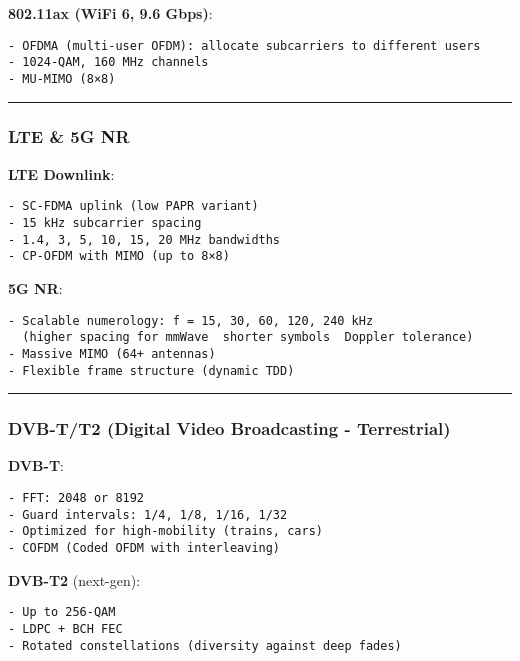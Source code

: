 \textbf{802.11ax (WiFi 6, 9.6 Gbps)}:

\begin{verbatim}
- OFDMA (multi-user OFDM): allocate subcarriers to different users
- 1024-QAM, 160 MHz channels
- MU-MIMO (8×8)
\end{verbatim}

\begin{center}\rule{0.5\linewidth}{0.5pt}\end{center}

\subsubsection{LTE \& 5G NR}\label{lte-5g-nr}

\textbf{LTE Downlink}:

\begin{verbatim}
- SC-FDMA uplink (low PAPR variant)
- 15 kHz subcarrier spacing
- 1.4, 3, 5, 10, 15, 20 MHz bandwidths
- CP-OFDM with MIMO (up to 8×8)
\end{verbatim}

\textbf{5G NR}:

\begin{verbatim}
- Scalable numerology: f = 15, 30, 60, 120, 240 kHz
  (higher spacing for mmWave  shorter symbols  Doppler tolerance)
- Massive MIMO (64+ antennas)
- Flexible frame structure (dynamic TDD)
\end{verbatim}

\begin{center}\rule{0.5\linewidth}{0.5pt}\end{center}

\subsubsection{DVB-T/T2 (Digital Video Broadcasting -
Terrestrial)}\label{dvb-tt2-digital-video-broadcasting---terrestrial}

\textbf{DVB-T}:

\begin{verbatim}
- FFT: 2048 or 8192
- Guard intervals: 1/4, 1/8, 1/16, 1/32
- Optimized for high-mobility (trains, cars)
- COFDM (Coded OFDM with interleaving)
\end{verbatim}

\textbf{DVB-T2} (next-gen):

\begin{verbatim}
- Up to 256-QAM
- LDPC + BCH FEC
- Rotated constellations (diversity against deep fades)
\end{verbatim}

